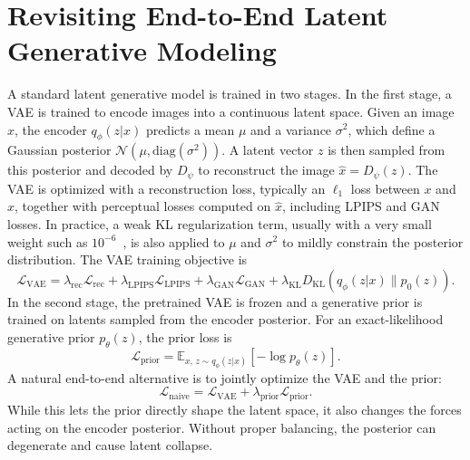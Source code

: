 \documentclass[]{bytedance_seed}
\begin{document}
\section{Revisiting End-to-End Latent Generative Modeling}
\label{sec:revisiting_e2e}
A standard latent generative model is trained in two stages. 
In the first stage, a VAE is trained to encode images into a continuous latent space. 
Given an image $x$, the encoder $q_\phi(z|x)$ predicts a mean $\mu$ and a variance $\sigma^2$, which define a Gaussian posterior $\mathcal{N}(\mu, \mathrm{diag}(\sigma^2))$. 
A latent vector $z$ is then sampled from this posterior and decoded by $D_\psi$ to reconstruct the image $\hat{x}=D_\psi(z)$. 
The VAE is optimized with a reconstruction loss, typically an $\ell_1$ loss between $x$ and $\hat{x}$, together with perceptual losses computed on $\hat{x}$, including LPIPS and GAN losses. 
In practice, a weak KL regularization term, usually with a very small weight such as $10^{-6}$~\cite{ldm}, is also applied to $\mu$ and $\sigma^2$ to mildly constrain the posterior distribution.
The VAE training objective is
\begin{equation}
    \mathcal{L}_{\mathrm{VAE}}
    =
    \lambda_{\mathrm{rec}}\mathcal{L}_{\mathrm{rec}}
    +
    \lambda_{\mathrm{LPIPS}}\mathcal{L}_{\mathrm{LPIPS}}
    +
    \lambda_{\mathrm{GAN}}\mathcal{L}_{\mathrm{GAN}}
    +
    \lambda_{\mathrm{KL}}
    D_{\mathrm{KL}}(q_\phi(z|x)\|p_0(z)).
\end{equation}
In the second stage, the pretrained VAE is frozen and a generative prior is trained on latents sampled from the encoder posterior.
For an exact-likelihood generative prior $p_\theta(z)$, the prior loss is
\begin{equation}
    \mathcal{L}_{\mathrm{prior}}
    =
    \mathbb{E}_{x,\,z\sim q_\phi(z|x)}
    \left[-\log p_\theta(z)\right].
\end{equation}
A natural end-to-end alternative is to jointly optimize the VAE and the prior:
\begin{equation}
    \mathcal{L}_{\mathrm{naive}}
    =
    \mathcal{L}_{\mathrm{VAE}}
    +
    \lambda_{\mathrm{prior}}\mathcal{L}_{\mathrm{prior}}.
    \label{eq:naive_e2e}
\end{equation}
While this lets the prior directly shape the latent space, it also changes the forces acting on the encoder posterior. 
Without proper balancing, the posterior can degenerate and cause latent collapse.
\end{document}
